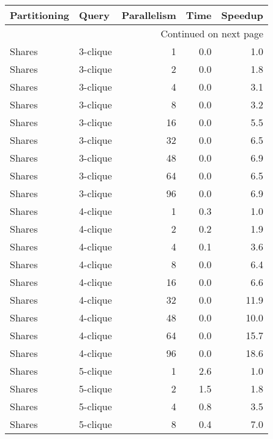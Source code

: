 \begin{longtable}{llr|rr}
\toprule
  Partitioning &     Query &  Parallelism &  Time &  Speedup \\
\midrule
\endhead
\midrule
\multicolumn{5}{r}{{Continued on next page}} \\
\midrule
\endfoot

\bottomrule
\endlastfoot
        Shares &  3-clique &            1 &   0.0 &      1.0 \\
        Shares &  3-clique &            2 &   0.0 &      1.8 \\
        Shares &  3-clique &            4 &   0.0 &      3.1 \\
        Shares &  3-clique &            8 &   0.0 &      3.2 \\
        Shares &  3-clique &           16 &   0.0 &      5.5 \\
        Shares &  3-clique &           32 &   0.0 &      6.5 \\
        Shares &  3-clique &           48 &   0.0 &      6.9 \\
        Shares &  3-clique &           64 &   0.0 &      6.5 \\
        Shares &  3-clique &           96 &   0.0 &      6.9 \\
        Shares &  4-clique &            1 &   0.3 &      1.0 \\
        Shares &  4-clique &            2 &   0.2 &      1.9 \\
        Shares &  4-clique &            4 &   0.1 &      3.6 \\
        Shares &  4-clique &            8 &   0.0 &      6.4 \\
        Shares &  4-clique &           16 &   0.0 &      6.6 \\
        Shares &  4-clique &           32 &   0.0 &     11.9 \\
        Shares &  4-clique &           48 &   0.0 &     10.0 \\
        Shares &  4-clique &           64 &   0.0 &     15.7 \\
        Shares &  4-clique &           96 &   0.0 &     18.6 \\
        Shares &  5-clique &            1 &   2.6 &      1.0 \\
        Shares &  5-clique &            2 &   1.5 &      1.8 \\
        Shares &  5-clique &            4 &   0.8 &      3.5 \\
        Shares &  5-clique &            8 &   0.4 &      7.0 \\

\end{longtable}
